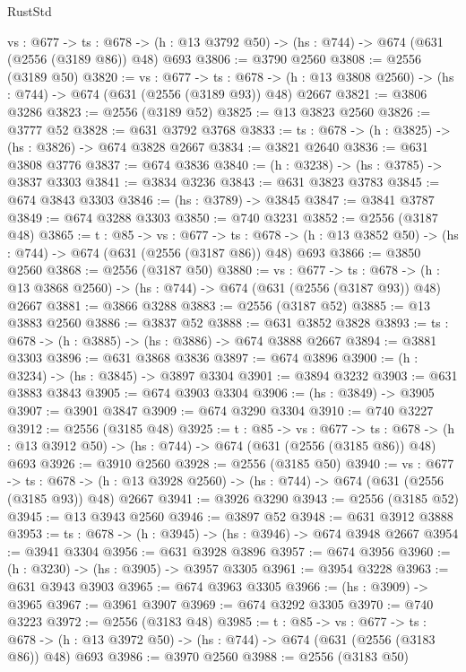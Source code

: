\begin{lexlean}{RustStd}
\begin{coremodule}
  {vs : @677} ->
  {ts : @678} -> (h : @13 @3792 @50) -> (hs : @744) -> @674 (@631 (@2556 (@3189 @86)) @48) @693
@3806 := @3790 @2560
@3808 := @2556 (@3189 @50)
@3820 := {vs : @677} ->
  {ts : @678} -> (h : @13 @3808 @2560) -> (hs : @744) -> @674 (@631 (@2556 (@3189 @93)) @48) @2667
@3821 := @3806 @3286
@3823 := @2556 (@3189 @52)
@3825 := @13 @3823 @2560
@3826 := @3777 @52
@3828 := @631 @3792 @3768
@3833 := {ts : @678} -> (h : @3825) -> (hs : @3826) -> @674 @3828 @2667
@3834 := @3821 @2640
@3836 := @631 @3808 @3776
@3837 := @674 @3836
@3840 := (h : @3238) -> (hs : @3785) -> @3837 @3303
@3841 := @3834 @3236
@3843 := @631 @3823 @3783
@3845 := @674 @3843 @3303
@3846 := (hs : @3789) -> @3845
@3847 := @3841 @3787
@3849 := @674 @3288 @3303
@3850 := @740 @3231
@3852 := @2556 (@3187 @48)
@3865 := {t : @85} ->
  {vs : @677} ->
  {ts : @678} -> (h : @13 @3852 @50) -> (hs : @744) -> @674 (@631 (@2556 (@3187 @86)) @48) @693
@3866 := @3850 @2560
@3868 := @2556 (@3187 @50)
@3880 := {vs : @677} ->
  {ts : @678} -> (h : @13 @3868 @2560) -> (hs : @744) -> @674 (@631 (@2556 (@3187 @93)) @48) @2667
@3881 := @3866 @3288
@3883 := @2556 (@3187 @52)
@3885 := @13 @3883 @2560
@3886 := @3837 @52
@3888 := @631 @3852 @3828
@3893 := {ts : @678} -> (h : @3885) -> (hs : @3886) -> @674 @3888 @2667
@3894 := @3881 @3303
@3896 := @631 @3868 @3836
@3897 := @674 @3896
@3900 := (h : @3234) -> (hs : @3845) -> @3897 @3304
@3901 := @3894 @3232
@3903 := @631 @3883 @3843
@3905 := @674 @3903 @3304
@3906 := (hs : @3849) -> @3905
@3907 := @3901 @3847
@3909 := @674 @3290 @3304
@3910 := @740 @3227
@3912 := @2556 (@3185 @48)
@3925 := {t : @85} ->
  {vs : @677} ->
  {ts : @678} -> (h : @13 @3912 @50) -> (hs : @744) -> @674 (@631 (@2556 (@3185 @86)) @48) @693
@3926 := @3910 @2560
@3928 := @2556 (@3185 @50)
@3940 := {vs : @677} ->
  {ts : @678} -> (h : @13 @3928 @2560) -> (hs : @744) -> @674 (@631 (@2556 (@3185 @93)) @48) @2667
@3941 := @3926 @3290
@3943 := @2556 (@3185 @52)
@3945 := @13 @3943 @2560
@3946 := @3897 @52
@3948 := @631 @3912 @3888
@3953 := {ts : @678} -> (h : @3945) -> (hs : @3946) -> @674 @3948 @2667
@3954 := @3941 @3304
@3956 := @631 @3928 @3896
@3957 := @674 @3956
@3960 := (h : @3230) -> (hs : @3905) -> @3957 @3305
@3961 := @3954 @3228
@3963 := @631 @3943 @3903
@3965 := @674 @3963 @3305
@3966 := (hs : @3909) -> @3965
@3967 := @3961 @3907
@3969 := @674 @3292 @3305
@3970 := @740 @3223
@3972 := @2556 (@3183 @48)
@3985 := {t : @85} ->
  {vs : @677} ->
  {ts : @678} -> (h : @13 @3972 @50) -> (hs : @744) -> @674 (@631 (@2556 (@3183 @86)) @48) @693
@3986 := @3970 @2560
@3988 := @2556 (@3183 @50)

\end{coremodule}
\end{lexlean}
